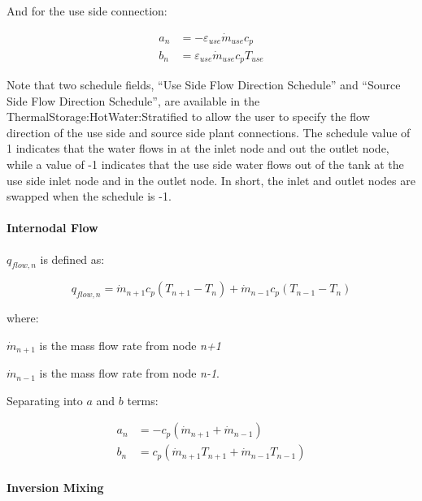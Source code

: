 And for the use side connection:

\begin{equation}
  \begin{array}{rl}
    a_n &= - \varepsilon_{use} \dot{m}_{use} c_p \\
    b_n &= \varepsilon_{use} \dot{m}_{use} c_p T_{use}
  \end{array}
\end{equation}

Note that two schedule fields, ``Use Side Flow Direction Schedule'' and ``Source Side
Flow Direction Schedule'', are available in the ThermalStorage:HotWater:Stratified
to allow the user to specify the flow direction of the use side and source side
plant connections. The schedule value of 1 indicates that the water flows in at
the inlet node and out the outlet node, while a value of -1 indicates that the
use side water flows out of the tank at the use side inlet node and in the
outlet node. In short, the inlet and outlet nodes are swapped when the schedule
is -1.

\paragraph{Internodal Flow}

\(q_{flow,n}\) is defined as:

\begin{equation}
{q_{flow,n}} = {\dot m_{n + 1}}{c_p}({T_{n + 1}} - {T_n}) + {\dot m_{n - 1}}{c_p}({T_{n - 1}} - {T_n})
\end{equation}

where:

\({\dot m_{n + 1}}\) is the mass flow rate from node \emph{n+1}

\({\dot m_{n - 1}}\) is the mass flow rate from node \emph{n-1}.

Separating into $a$ and $b$ terms:

\begin{equation}
  \begin{array}{rl}
    a_n &= - c_p (\dot m_{n+1} + \dot m_{n-1}) \\
    b_n &= c_p (\dot m_{n+1} T_{n+1} + \dot m_{n-1} T_{n-1})
  \end{array}
\end{equation}

\paragraph{Inversion Mixing}

